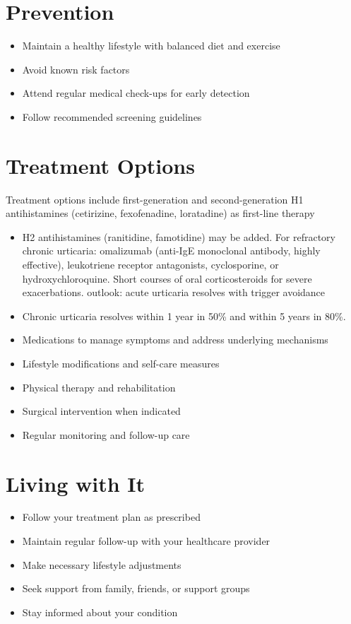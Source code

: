 \section{Prevention}
\begin{itemize}[noitemsep]
  \item Maintain a healthy lifestyle with balanced diet and exercise
  \item Avoid known risk factors
  \item Attend regular medical check-ups for early detection
  \item Follow recommended screening guidelines
\end{itemize}
\section{Treatment Options}
Treatment options include first-generation and second-generation H1 antihistamines (cetirizine, fexofenadine, loratadine) as first-line therapy

\begin{itemize}[noitemsep]
  \item H2 antihistamines (ranitidine, famotidine) may be added. For refractory chronic urticaria: omalizumab (anti-IgE monoclonal antibody, highly effective), leukotriene receptor antagonists, cyclosporine, or hydroxychloroquine. Short courses of oral corticosteroids for severe exacerbations. outlook: acute urticaria resolves with trigger avoidance
  \item Chronic urticaria resolves within 1 year in 50\% and within 5 years in 80\%.
  \item Medications to manage symptoms and address underlying mechanisms
  \item Lifestyle modifications and self-care measures
  \item Physical therapy and rehabilitation
  \item Surgical intervention when indicated
  \item Regular monitoring and follow-up care
\end{itemize}
\section{Living with It}
\begin{itemize}[noitemsep]
  \item Follow your treatment plan as prescribed
  \item Maintain regular follow-up with your healthcare provider
  \item Make necessary lifestyle adjustments
  \item Seek support from family, friends, or support groups
  \item Stay informed about your condition
\end{itemize}
